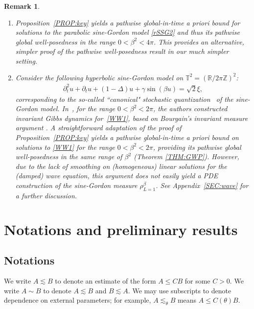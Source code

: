 \documentclass[letterpaper, 11pt,  reqno]{amsart}
\theoremstyle{myremark}
\newtheorem{remark}[theorem]{Remark}
\newcommand{\1}{\hspace{0.5mm}\text{I}\hspace{0.5mm}}
\newcommand{\Z}{\mathbb{Z}}
\newcommand{\R}{\mathbb{R}}
\newcommand{\T}{\mathbb{T}}
\newcommand{\be}{\beta}
\newcommand{\Dl}{\Delta}
\newcommand{\g}{\gamma}
\newcommand{\dt}{\partial_t}
\newcommand{\ta}{\theta}
\newcommand{\les}{\lesssim}
\numberwithin{equation}{section}
\numberwithin{theorem}{section}
\begin{document}
 \begin{remark}
\begin{enumerate}
\item Proposition~\ref{PROP:key}
 yields  a pathwise global-in-time
a priori bound for solutions to the parabolic sine-Gordon model
\eqref{rSSG2}
and thus its pathwise global well-posedness
in the range $0 < \be^2 < 4 \pi$.
This provides an alternative, simpler proof
of the pathwise well-posedness result \cite[Corollary~3]{CFW}
in our much simpler setting. %

\item 
Consider 
the following
hyperbolic sine-Gordon model on $\T^2 = (\R/2\pi \Z)^2$:
\begin{align}
\dt^2 u + \dt u + (1- \Dl)  u   +  \g \sin(\be u) = \sqrt{2}\xi, 
\label{WW1}
\end{align}
 corresponding to the 
so-called ``canonical" stochastic quantization~\cite{RSS} 
of the sine-Gordon model.
In~\cite{ORSW}, 
for the range $0 < \be^2 < 2\pi$, 
the authors constructed invariant Gibbs dynamics for~\eqref{WW1}, 
 based on Bourgain's invariant measure argument
\cite{BO94, BO96}.
A straightforward adaptation of the proof
of Proposition~\ref{PROP:key}
yields
a pathwise  global-in-time a priori bound on solutions to \eqref{WW1}
for the range $0 < \be^2 < 2\pi$, 
providing its pathwise global well-posedness
in the same range of $\be^2$
(Theorem \ref{THM:GWP}).
However, due to the lack of smoothing on (homogeneous)
linear solutions for the (damped) wave equation, this argument does not 
easily yield a PDE construction of the sine-Gordon measure $\rho^\be_{L = 1}$.
See Appendix~\ref{SEC:wave}
for a further discussion.
\end{enumerate}
\end{remark}







\section{Notations and preliminary results}
\label{SEC:N}


\subsection{Notations}\label{SUBSEC:N1} 
 We write $ A \les B $ to denote an estimate of the form $ A \leq CB $
 for some $C > 0$. 
We write  $ A \sim B $ to denote $ A \les B $ and $ B \les A $.
We may use subscripts to denote dependence on external parameters; for example,
 $A \les_\ta B$ means $A \leq C(\ta) B$.
\end{document}
